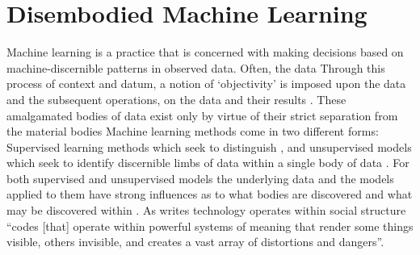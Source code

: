 \section{Disembodied Machine Learning}
Machine learning is a practice that is concerned with making decisions based on machine-discernible patterns in observed data.
Often, the data 
Through this process of  context and datum, a notion of `objectivity' is imposed upon the data and the subsequent operations,  on the data and their results .
These amalgamated bodies of data exist only by virtue of their strict separation from the material bodies 
Machine learning methods come in two different forms: Supervised learning methods which seek to  distinguish 
, and unsupervised models which seek to identify discernible limbs of data within a single body of data .
For both supervised and unsupervised models  the underlying data and the models applied to them have strong influences as to what bodies are discovered and what may be discovered within .
As \citet{Benjamin:2019} writes technology operates within social structure ``codes [that] operate within powerful systems of meaning that render some things visible, others invisible, and creates a vast array of distortions and dangers''.\vspace{5mm}

